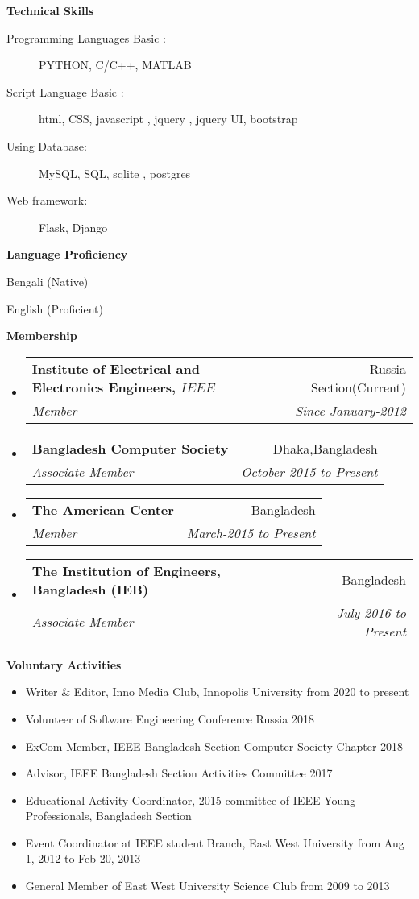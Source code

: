 \documentclass[letterpaper,10pt]{article}
\makeatletter
\newcommand{\resitem}[1]{\item #1 \vspace{-2pt}}
\newcommand{\resheading}[1]{{\large \colorbox{mygrey}{\begin{minipage}{\textwidth}{\textbf{#1 \vphantom{p\^{E}}}}\end{minipage}}}}
\newcommand{\ressubheading}[4]{
\begin{tabular*}{6.5in}{l@{\extracolsep{\fill}}r}
		\textbf{#1} & #2 \\
		\textit{#3} & \textit{#4} \\
\end{tabular*}\vspace{-6pt}}
\makeatother
\begin{document}
\begin{description}
\item
\resitem{\textbf{Technical Skills}}
\begin{description}
\item[Programming Languages Basic :] PYTHON, C/C++, MATLAB
\item[Script Language Basic :] html, CSS, javascript , jquery , jquery UI, bootstrap
\item[Using Database:] MySQL, SQL, sqlite , postgres 
\item[Web framework:] Flask, Django

\end{description}
\item
\resitem{\textbf{Language Proficiency}}
\begin{description}
\item{Bengali (Native)}
\item{English (Proficient)}
\end{description}
\end{description}

 \resheading{Membership}
 \begin{itemize}
 \item
 \ressubheading{Institute of Electrical and Electronics Engineers, \(IEEE\)}{Russia Section(Current)}{Member}{Since January-2012}


 \item
 \ressubheading{Bangladesh Computer Society}{Dhaka,Bangladesh }{Associate Member}{October-2015 to Present}
 \item
 \ressubheading{The American Center}{Bangladesh}{Member}{March-2015 to Present }
 \item
 \ressubheading{ The Institution of Engineers, Bangladesh (IEB)}{Bangladesh}{Associate Member}{July-2016 to Present }

 \end{itemize}

\resheading{Voluntary Activities}
\begin{itemize}
\item Writer \& Editor, Inno Media Club, Innopolis University from 2020 to present 
	\item{Volunteer of Software Engineering Conference Russia 2018 }
	\item{ExCom Member, IEEE Bangladesh Section Computer Society Chapter 2018 }
	\item {Advisor, IEEE Bangladesh Section Activities Committee 2017}
\item {Educational Activity Coordinator, 2015 committee of IEEE Young Professionals, Bangladesh Section}
    \item{Event Coordinator at IEEE student Branch, East West University from Aug 1, 2012 to Feb 20, 2013 }
    \item {General Member of East West University Science Club from 2009 to 2013}
\end{itemize}
\end{document}

